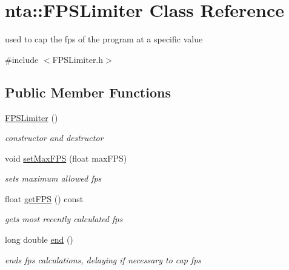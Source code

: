 \hypertarget{classnta_1_1FPSLimiter}{}\section{nta\+:\+:F\+P\+S\+Limiter Class Reference}
\label{classnta_1_1FPSLimiter}


used to cap the fps of the program at a specific value  




{\ttfamily \#include $<$F\+P\+S\+Limiter.\+h$>$}

\subsection*{Public Member Functions}
\begin{DoxyCompactItemize}
\item 
\mbox{\label{classnta_1_1FPSLimiter_a7a866e0bc883bdd26e80e95748f4052c}} 
\hyperlink{classnta_1_1FPSLimiter_a7a866e0bc883bdd26e80e95748f4052c}{F\+P\+S\+Limiter} ()
\begin{DoxyCompactList}\small\item\em constructor and destructor \end{DoxyCompactList}\item 
\mbox{\label{classnta_1_1FPSLimiter_ac72ab398095957d9cffa07859e1f97a4}} 
void \hyperlink{classnta_1_1FPSLimiter_ac72ab398095957d9cffa07859e1f97a4}{set\+Max\+F\+PS} (float max\+F\+PS)
\begin{DoxyCompactList}\small\item\em sets maximum allowed fps \end{DoxyCompactList}\item 
\mbox{\label{classnta_1_1FPSLimiter_a682d191b70ddecf8f7ed776dc586fe27}} 
float \hyperlink{classnta_1_1FPSLimiter_a682d191b70ddecf8f7ed776dc586fe27}{get\+F\+PS} () const
\begin{DoxyCompactList}\small\item\em gets most recently calculated fps \end{DoxyCompactList}\item 
\mbox{\label{classnta_1_1FPSLimiter_a17003ecbc30d60c58112615fcaee4d1e}} 
long double \hyperlink{classnta_1_1FPSLimiter_a17003ecbc30d60c58112615fcaee4d1e}{end} ()
\begin{DoxyCompactList}\small\item\em ends fps calculations, delaying if necessary to cap fps \end{DoxyCompactList}\end{DoxyCompactItemize}
